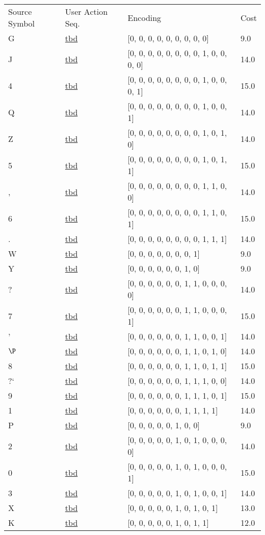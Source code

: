 \documentclass[12pt]{article}
\begin{document}
\begin{tabular}{l l l l}
Source Symbol	&	User Action Seq.	&	Encoding	&	Cost\\
G	&	\url{tbd}	&	[0, 0, 0, 0, 0, 0, 0, 0, 0]	&	9.0\\
J	&	\url{tbd}	&	[0, 0, 0, 0, 0, 0, 0, 0, 1, 0, 0, 0, 0]	&	14.0\\
4	&	\url{tbd}	&	[0, 0, 0, 0, 0, 0, 0, 0, 1, 0, 0, 0, 1]	&	15.0\\
Q	&	\url{tbd}	&	[0, 0, 0, 0, 0, 0, 0, 0, 1, 0, 0, 1]	&	14.0\\
Z	&	\url{tbd}	&	[0, 0, 0, 0, 0, 0, 0, 0, 1, 0, 1, 0]	&	14.0\\
5	&	\url{tbd}	&	[0, 0, 0, 0, 0, 0, 0, 0, 1, 0, 1, 1]	&	15.0\\
,	&	\url{tbd}	&	[0, 0, 0, 0, 0, 0, 0, 0, 1, 1, 0, 0]	&	14.0\\
6	&	\url{tbd}	&	[0, 0, 0, 0, 0, 0, 0, 0, 1, 1, 0, 1]	&	15.0\\
.	&	\url{tbd}	&	[0, 0, 0, 0, 0, 0, 0, 0, 1, 1, 1]	&	14.0\\
W	&	\url{tbd}	&	[0, 0, 0, 0, 0, 0, 0, 1]	&	9.0\\
Y	&	\url{tbd}	&	[0, 0, 0, 0, 0, 0, 1, 0]	&	9.0\\
?	&	\url{tbd}	&	[0, 0, 0, 0, 0, 0, 1, 1, 0, 0, 0, 0]	&	14.0\\
7	&	\url{tbd}	&	[0, 0, 0, 0, 0, 0, 1, 1, 0, 0, 0, 1]	&	15.0\\
'	&	\url{tbd}	&	[0, 0, 0, 0, 0, 0, 1, 1, 0, 0, 1]	&	14.0\\
$\P$	&	\url{tbd}	&	[0, 0, 0, 0, 0, 0, 1, 1, 0, 1, 0]	&	14.0\\
8	&	\url{tbd}	&	[0, 0, 0, 0, 0, 0, 1, 1, 0, 1, 1]	&	15.0\\
?`	&	\url{tbd}	&	[0, 0, 0, 0, 0, 0, 1, 1, 1, 0, 0]	&	14.0\\
9	&	\url{tbd}	&	[0, 0, 0, 0, 0, 0, 1, 1, 1, 0, 1]	&	15.0\\
1	&	\url{tbd}	&	[0, 0, 0, 0, 0, 0, 1, 1, 1, 1]	&	14.0\\
P	&	\url{tbd}	&	[0, 0, 0, 0, 0, 1, 0, 0]	&	9.0\\
2	&	\url{tbd}	&	[0, 0, 0, 0, 0, 1, 0, 1, 0, 0, 0, 0]	&	14.0\\
0	&	\url{tbd}	&	[0, 0, 0, 0, 0, 1, 0, 1, 0, 0, 0, 1]	&	15.0\\
3	&	\url{tbd}	&	[0, 0, 0, 0, 0, 1, 0, 1, 0, 0, 1]	&	14.0\\
X	&	\url{tbd}	&	[0, 0, 0, 0, 0, 1, 0, 1, 0, 1]	&	13.0\\
K	&	\url{tbd}	&	[0, 0, 0, 0, 0, 1, 0, 1, 1]	&	12.0\\

\end{tabular}
\end{document}
